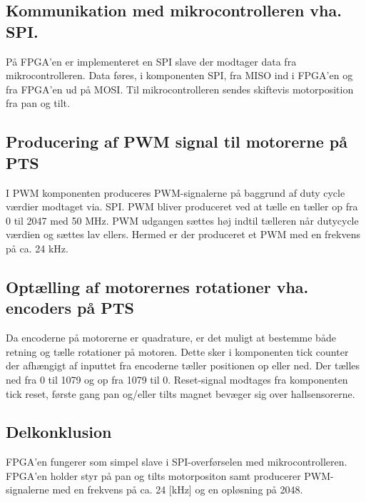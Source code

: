 \subsection[Kommunikation]{Kommunikation med mikrocontrolleren vha. SPI.}
På FPGA'en er implementeret en SPI slave der modtager data fra 
mikrocontrolleren. Data føres, i komponenten SPI, fra MISO ind i FPGA'en og fra FPGA'en ud på 
MOSI. Til mikrocontrolleren sendes skiftevis motorposition fra pan og tilt.

\subsection{Producering af PWM signal til motorerne på PTS}
I PWM komponenten produceres PWM-signalerne på baggrund af duty cycle værdier modtaget via. SPI. 
PWM bliver produceret ved at tælle en tæller op fra 0 til 2047 med 50 MHz.
PWM udgangen sættes høj indtil tælleren når dutycycle værdien og sættes lav 
ellers. Hermed er der produceret et PWM med en frekvens på ca. 24 kHz.

\subsection{Optælling af motorernes rotationer vha. encoders på PTS}
Da encoderne på motorerne er quadrature,
er det muligt at bestemme både retning og tælle rotationer på motoren. 
Dette sker i komponenten tick counter der afhængigt af inputtet fra encoderne tæller positionen op eller 
ned.
Der tælles ned fra 0 til 1079 og op fra 1079 til 0.
Reset-signal modtages fra komponenten tick reset, første gang pan og/eller tilts magnet bevæger 
sig over hallsensorerne.

\subsection{Delkonklusion}
FPGA'en fungerer som simpel slave i SPI-overførselen med mikrocontrolleren.
FPGA'en holder styr på pan og tilts motorpositon samt producerer PWM-signalerne 
med en frekvens på ca. 24 [kHz] og en opløsning på 2048.